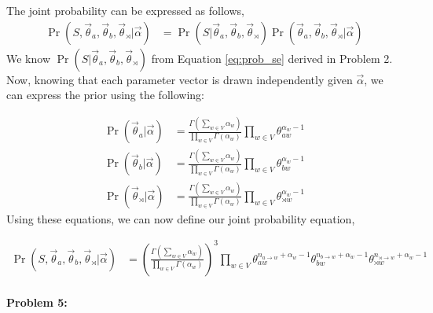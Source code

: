 \documentclass[10pt]{article}
\newenvironment{AnswerBox}{\begin{mdframed}[style=simple]}{\end{mdframed}}
\begin{document}
\begin{AnswerBox}%
The joint probability can be expressed as follows, \\
\begin{align*}
    \Pr(S, \vec{\theta}_{a}, \vec{\theta}_{b}, \vec{\theta}_{\rtimes} | \vec{\alpha}) & = \Pr(S|\vec{\theta}_{a}, \vec{\theta}_{b}, \vec{\theta}_{\rtimes})\Pr(\vec{\theta}_{a}, \vec{\theta}_{b}, \vec{\theta}_{\rtimes}|\vec{\alpha})
\end{align*}
We know $\Pr(S|\vec{\theta}_{a}, \vec{\theta}_{b}, \vec{\theta}_{\rtimes})$ from Equation \ref{eq:prob_se} derived in Problem 2. Now, knowing that each parameter vector is drawn independently given $\vec{\alpha}$, we can express the prior using the following:

\begin{align*}
    \Pr(\vec{\theta}_{a}|\vec{\alpha}) & =  \frac{\Gamma (\sum_{w\in V} \alpha_{w})}{\prod_{w\in V} \Gamma (\alpha_{w})}\prod_{w\in V}\theta_{aw}^{\alpha_{w} -1}\\
    \Pr(\vec{\theta}_{b}|\vec{\alpha}) & =  \frac{\Gamma (\sum_{w\in V} \alpha_{w})}{\prod_{w\in V} \Gamma (\alpha_{w})}\prod_{w\in V}\theta_{bw}^{\alpha_{w} -1}\\
    \Pr(\vec{\theta}_{\rtimes}|\vec{\alpha}) & =  \frac{\Gamma (\sum_{w\in V} \alpha_{w})}{\prod_{w\in V} \Gamma (\alpha_{w})}\prod_{w\in V}\theta_{\rtimes w}^{\alpha_{w} -1}
\end{align*}
Using these equations, we can now define our joint probability equation,

\begin{align}\label{eq:joint}
    \Pr(S, \vec{\theta}_{a}, \vec{\theta}_{b}, \vec{\theta}_{\rtimes} | \vec{\alpha}) & = 
     \left (\frac{\Gamma (\sum_{w\in V} \alpha_{w})}{\prod_{w\in V} \Gamma (\alpha_{w})}\right )^3 \prod_{w\in V} \theta_{aw}^{n_{a \rightarrow w}+ \alpha_{w} -1} \theta_{bw}^{n_{b \rightarrow w}+\alpha_{w} -1} \theta_{\rtimes w}^{n_{\rtimes \rightarrow w}+\alpha_{w} -1}
\end{align}



    
\end{AnswerBox}%


\hrulefill %

\paragraph{Problem 5:}
\end{document}

